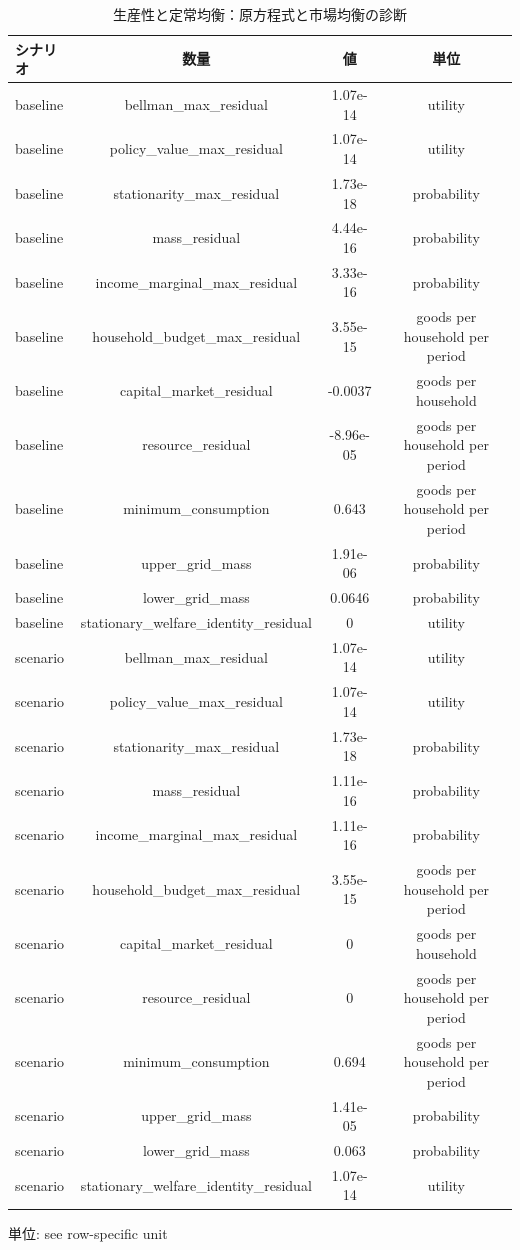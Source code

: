 \begingroup
\begin{table}[htbp]
\centering
\caption{生産性と定常均衡：原方程式と市場均衡の診断}
\label{tab:specialist-aiyagari-r01-displays-diagnostics}
\begin{tabular}{lccc}
\toprule
シナリオ & 数量 & 値 & 単位 \\
\midrule
baseline & bellman\_max\_residual & 1.07e-14 & utility \\
baseline & policy\_value\_max\_residual & 1.07e-14 & utility \\
baseline & stationarity\_max\_residual & 1.73e-18 & probability \\
baseline & mass\_residual & 4.44e-16 & probability \\
baseline & income\_marginal\_max\_residual & 3.33e-16 & probability \\
baseline & household\_budget\_max\_residual & 3.55e-15 & goods per household per period \\
baseline & capital\_market\_residual & -0.0037 & goods per household \\
baseline & resource\_residual & -8.96e-05 & goods per household per period \\
baseline & minimum\_consumption & 0.643 & goods per household per period \\
baseline & upper\_grid\_mass & 1.91e-06 & probability \\
baseline & lower\_grid\_mass & 0.0646 & probability \\
baseline & stationary\_welfare\_identity\_residual & 0 & utility \\
scenario & bellman\_max\_residual & 1.07e-14 & utility \\
scenario & policy\_value\_max\_residual & 1.07e-14 & utility \\
scenario & stationarity\_max\_residual & 1.73e-18 & probability \\
scenario & mass\_residual & 1.11e-16 & probability \\
scenario & income\_marginal\_max\_residual & 1.11e-16 & probability \\
scenario & household\_budget\_max\_residual & 3.55e-15 & goods per household per period \\
scenario & capital\_market\_residual & 0 & goods per household \\
scenario & resource\_residual & 0 & goods per household per period \\
scenario & minimum\_consumption & 0.694 & goods per household per period \\
scenario & upper\_grid\_mass & 1.41e-05 & probability \\
scenario & lower\_grid\_mass & 0.063 & probability \\
scenario & stationary\_welfare\_identity\_residual & 1.07e-14 & utility \\
\bottomrule
\end{tabular}
\par\medskip\begin{minipage}{\linewidth}\footnotesize
単位: see row-specific unit
\end{minipage}
\end{table}
\endgroup
